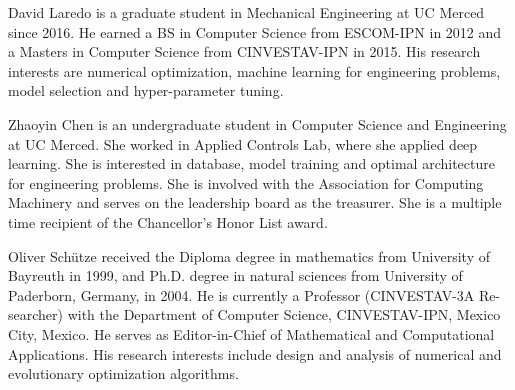 
\begin{biography}{David Laredo}
is a graduate student in Mechanical Engineering at UC Merced since 2016. He earned a BS in Computer Science from ESCOM-IPN in 2012 and a Masters in Computer Science from CINVESTAV-IPN in 2015. His research interests are numerical optimization, machine learning for engineering problems, model selection and hyper-parameter tuning.
\end{biography}

\begin{biography}{Zhaoyin Chen}
is an undergraduate student in Computer Science and Engineering at UC Merced. 
She worked in Applied Controls Lab, where she applied deep learning.
She is interested in database, model training and optimal architecture for engineering problems. She is involved
with the Association for Computing Machinery and serves
on the leadership board as the treasurer. She is a multiple time
recipient of the Chancellor's Honor List award.
\end{biography}

\begin{biography}{Oliver Sch\"utze}
received the Diploma degree in mathematics from University
of Bayreuth in 1999, and Ph.D. degree in natural
sciences from University of Paderborn, Germany, in
2004. He is currently a Professor (CINVESTAV-3A Re-searcher) with the Department
of Computer Science, CINVESTAV-IPN, Mexico City, Mexico. He serves as Editor-in-Chief of Mathematical and Computational Applications. His research interests include design and analysis of numerical and evolutionary optimization algorithms.
\end{biography}

